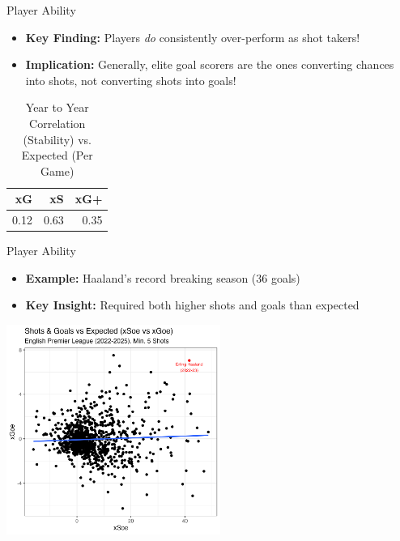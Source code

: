 \documentclass{beamer}
\begin{document}
\begin{frame}{Player Ability}
\begin{itemize}
\item \textbf{Key Finding:} Players \emph{do} consistently over-perform as shot takers!
\item \textbf{Implication:} Generally, elite goal scorers are the ones converting chances into shots, not converting shots into goals!
\end{itemize}

\begin{table}[!h]
\centering
\caption{Year to Year Correlation (Stability) vs. Expected (Per Game)}
\begin{tabular}[t]{rrr}
\toprule
xG & xS & xG+\\
\midrule
0.12 & 0.63 & 0.35\\
\bottomrule
\end{tabular}
\end{table}
\end{frame}

\begin{frame}{Player Ability}
\begin{itemize}
\item \textbf{Example:} Haaland's record breaking season (36 goals)
\item \textbf{Key Insight:} Required both higher shots and goals than expected
\end{itemize}

\centering
\includegraphics[width=2.75in]{figures/xseoe_vs_xgoe.png}
\end{frame}
\end{document}
